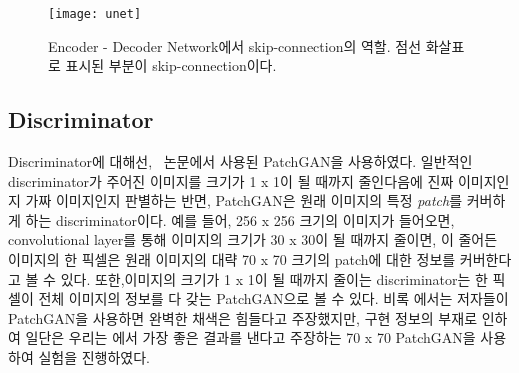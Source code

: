 \begin{figure}[t]
	\centering
	\texttt{[image: unet]}
	\caption{Encoder - Decoder Network에서 skip-connection의 역할. 점선 화살표로 표시된 부분이 skip-connection이다.}
	\label{fig:unet}
\end{figure}


\subsection{Discriminator}

Discriminator에 대해선, \pixpix~논문에서 사용된 PatchGAN을 사용하였다.
일반적인 discriminator가 주어진 이미지를 크기가 1 x 1이 될 때까지 줄인다음에 진짜 이미지인지 가짜 이미지인지 판별하는 반면, PatchGAN은 원래 이미지의 특정 \textit{patch}를 커버하게 하는 discriminator이다.
예를 들어, 256 x 256 크기의 이미지가 들어오면, convolutional layer를 통해 이미지의 크기가 30 x 30이 될 때까지 줄이면, 이 줄어든 이미지의 한 픽셀은 원래 이미지의 대략 70 x 70 크기의 patch에 대한 정보를 커버한다고 볼 수 있다.
또한,이미지의 크기가 1 x 1이 될 때까지 줄이는 discriminator는 한 픽셀이 전체 이미지의 정보를 다 갖는 PatchGAN으로 볼 수 있다.
비록 \stylepaint 에서는 저자들이 PatchGAN을 사용하면 완벽한 채색은 힘들다고 주장했지만, 구현 정보의 부재로 인하여 일단은 우리는 \pixpix 에서 가장 좋은 결과를 낸다고 주장하는 70 x 70 PatchGAN을 사용하여 실험을 진행하였다.